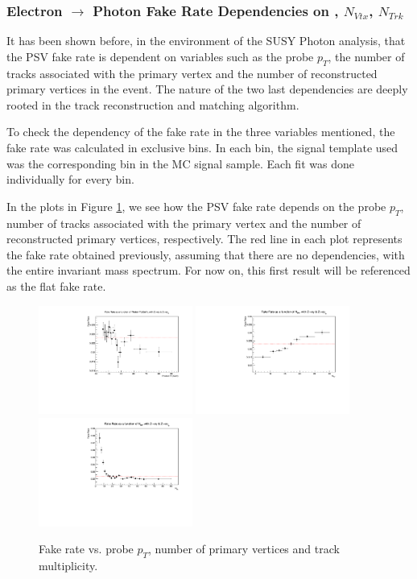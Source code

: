 \subsubsection{Electron $\rightarrow$ Photon Fake Rate Dependencies on \pt, $N_{Vtx}$, $N_{Trk}$}

It has been shown before, in the environment of the SUSY Photon analysis, that the PSV fake rate is dependent on variables such as the probe $p_T$, the number of tracks associated with the primary vertex and the number of reconstructed primary vertices in the event. The nature of the two last dependencies are deeply rooted in the track reconstruction and matching algorithm. 

To check the dependency of the fake rate in the three variables mentioned, the fake rate was calculated in exclusive bins. In each bin, the signal template used was the corresponding bin in the MC signal sample. Each fit was done individually for every bin.

In the plots in Figure \ref{fig:FR_all}, we see how the PSV fake rate depends on the probe $p_T$, number of tracks associated with the primary vertex and the number of reconstructed primary vertices, respectively. The red line in each plot represents the fake rate obtained previously, assuming that there are no dependencies, with the entire invariant mass spectrum. For now on, this first result will be referenced as the flat fake rate.


\begin{figure}[H]
\begin{center}
{\includegraphics[width=0.45\textwidth]{efake_figs/FakeRate_Pt.pdf}}
{\includegraphics[width=0.45\textwidth]{efake_figs/FakeRate_PU.pdf}}
{\includegraphics[width=0.45\textwidth]{efake_figs/FakeRate_Trk.pdf}}
\caption{Fake rate vs. probe $p_T$, number of primary vertices and track multiplicity.}
\label{fig:FR_all}
\end{center}
\end{figure}


